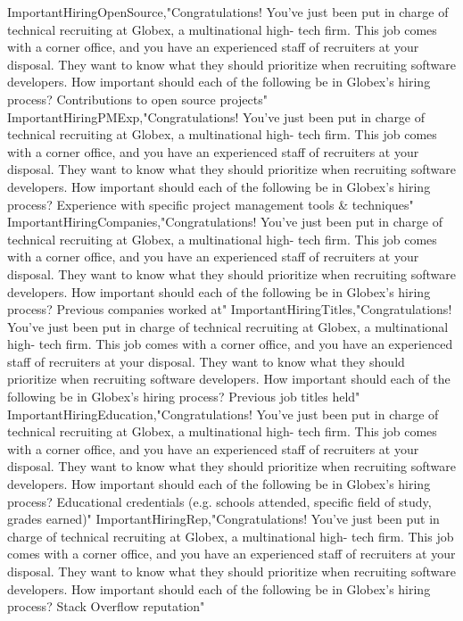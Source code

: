 \begin{appendices}
ImportantHiringOpenSource,"Congratulations! You've just been put in charge of technical recruiting at Globex, a multinational high- tech firm. This job comes with a corner office, and you have an experienced staff of recruiters at your disposal. They want to know what they should prioritize when recruiting software developers. How important should each of the following be in Globex's hiring process? Contributions to open source projects"
ImportantHiringPMExp,"Congratulations! You've just been put in charge of technical recruiting at Globex, a multinational high- tech firm. This job comes with a corner office, and you have an experienced staff of recruiters at your disposal. They want to know what they should prioritize when recruiting software developers. How important should each of the following be in Globex's hiring process? Experience with specific project management tools & techniques"
ImportantHiringCompanies,"Congratulations! You've just been put in charge of technical recruiting at Globex, a multinational high- tech firm. This job comes with a corner office, and you have an experienced staff of recruiters at your disposal. They want to know what they should prioritize when recruiting software developers. How important should each of the following be in Globex's hiring process? Previous companies worked at"
ImportantHiringTitles,"Congratulations! You've just been put in charge of technical recruiting at Globex, a multinational high- tech firm. This job comes with a corner office, and you have an experienced staff of recruiters at your disposal. They want to know what they should prioritize when recruiting software developers. How important should each of the following be in Globex's hiring process? Previous job titles held"
ImportantHiringEducation,"Congratulations! You've just been put in charge of technical recruiting at Globex, a multinational high- tech firm. This job comes with a corner office, and you have an experienced staff of recruiters at your disposal. They want to know what they should prioritize when recruiting software developers. How important should each of the following be in Globex's hiring process? Educational credentials (e.g. schools attended, specific field of study, grades earned)"
ImportantHiringRep,"Congratulations! You've just been put in charge of technical recruiting at Globex, a multinational high- tech firm. This job comes with a corner office, and you have an experienced staff of recruiters at your disposal. They want to know what they should prioritize when recruiting software developers. How important should each of the following be in Globex's hiring process? Stack Overflow reputation"

\end{appendices}
